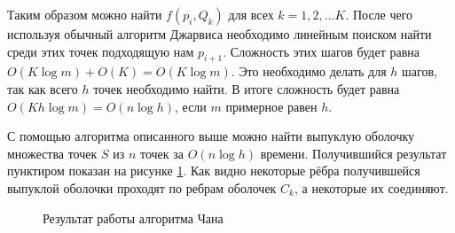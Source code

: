 
Таким образом можно найти $f(p_i, Q_k)$ для всех $k=1,2,...K$. После чего используя обычный алгоритм Джарвиса необходимо линейным поиском найти среди этих точек подходящую нам $p_{i+1}$. Сложность этих шагов будет равна $O(K \log m) + O(K) = O(K \log m)$. Это необходимо делать для $h$ шагов, так как всего $h$ точек необходимо найти. В итоге сложность будет равна $O(K h \log m) = O(n \log h)$, если $m$ примерное равен $h$.

С помощью алгоритма описанного выше можно найти выпуклую оболочку множества точек $S$ из $n$ точек за $O(n \log h)$ времени. Получившийся результат пунктиром показан на рисунке \ref{img:chan_2}. Как видно некоторые рёбра получившейся выпуклой оболочки проходят по ребрам оболочек $C_k$, а некоторые их соединяют.

\begin{figure}[H]
	\centering
	
	\caption{Результат работы алгоритма Чана}
	\label{img:chan_2}
\end{figure}

